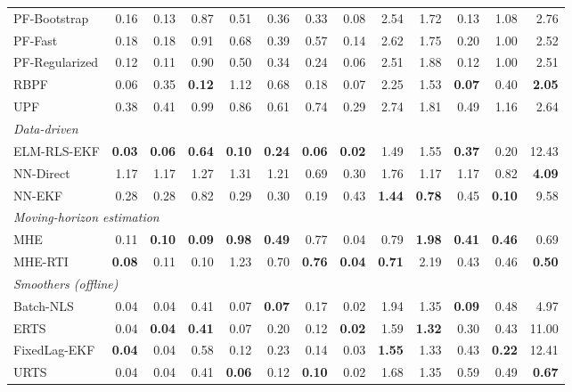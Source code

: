 \begin{longtable}{lrrrrrrrrrrrr}
\quad PF-Bootstrap & 0.16 & 0.13 & 0.87 & 0.51 & 0.36 & 0.33 & 0.08 & 2.54 & 1.72 & 0.13 & 1.08 & 2.76 \\
\quad PF-Fast & 0.18 & 0.18 & 0.91 & 0.68 & 0.39 & 0.57 & 0.14 & 2.62 & 1.75 & 0.20 & 1.00 & 2.52 \\
\quad PF-Regularized & 0.12 & 0.11 & 0.90 & 0.50 & 0.34 & 0.24 & 0.06 & 2.51 & 1.88 & 0.12 & 1.00 & 2.51 \\
\quad RBPF & 0.06 & 0.35 & \textbf{0.12} & 1.12 & 0.68 & 0.18 & 0.07 & 2.25 & 1.53 & \textbf{0.07} & 0.40 & \textbf{2.05} \\
\quad UPF & 0.38 & 0.41 & 0.99 & 0.86 & 0.61 & 0.74 & 0.29 & 2.74 & 1.81 & 0.49 & 1.16 & 2.64 \\
\multicolumn{13}{l}{\textit{Data-driven}} \\
\quad ELM-RLS-EKF & \textbf{0.03} & \textbf{0.06} & \textbf{0.64} & \textbf{0.10} & \textbf{0.24} & \textbf{0.06} & \textbf{0.02} & 1.49 & 1.55 & \textbf{0.37} & 0.20 & 12.43 \\
\quad NN-Direct & 1.17 & 1.17 & 1.27 & 1.31 & 1.21 & 0.69 & 0.30 & 1.76 & 1.17 & 1.17 & 0.82 & \textbf{4.09} \\
\quad NN-EKF & 0.28 & 0.28 & 0.82 & 0.29 & 0.30 & 0.19 & 0.43 & \textbf{1.44} & \textbf{0.78} & 0.45 & \textbf{0.10} & 9.58 \\
\multicolumn{13}{l}{\textit{Moving-horizon estimation}} \\
\quad MHE & 0.11 & \textbf{0.10} & \textbf{0.09} & \textbf{0.98} & \textbf{0.49} & 0.77 & 0.04 & 0.79 & \textbf{1.98} & \textbf{0.41} & \textbf{0.46} & 0.69 \\
\quad MHE-RTI & \textbf{0.08} & 0.11 & 0.10 & 1.23 & 0.70 & \textbf{0.76} & \textbf{0.04} & \textbf{0.71} & 2.19 & 0.43 & 0.46 & \textbf{0.50} \\
\multicolumn{13}{l}{\textit{Smoothers (offline)}} \\
\quad Batch-NLS & 0.04 & 0.04 & 0.41 & 0.07 & \textbf{0.07} & 0.17 & 0.02 & 1.94 & 1.35 & \textbf{0.09} & 0.48 & 4.97 \\
\quad ERTS & 0.04 & \textbf{0.04} & \textbf{0.41} & 0.07 & 0.20 & 0.12 & \textbf{0.02} & 1.59 & \textbf{1.32} & 0.30 & 0.43 & 11.00 \\
\quad FixedLag-EKF & \textbf{0.04} & 0.04 & 0.58 & 0.12 & 0.23 & 0.14 & 0.03 & \textbf{1.55} & 1.33 & 0.43 & \textbf{0.22} & 12.41 \\
\quad URTS & 0.04 & 0.04 & 0.41 & \textbf{0.06} & 0.12 & \textbf{0.10} & 0.02 & 1.68 & 1.35 & 0.59 & 0.49 & \textbf{0.67} \\
\bottomrule\end{longtable}\endgroup
